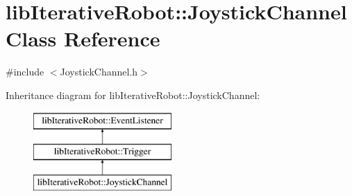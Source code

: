 \hypertarget{classlib_iterative_robot_1_1_joystick_channel}{}\section{lib\+Iterative\+Robot\+::Joystick\+Channel Class Reference}
\label{classlib_iterative_robot_1_1_joystick_channel}


{\ttfamily \#include $<$Joystick\+Channel.\+h$>$}

Inheritance diagram for lib\+Iterative\+Robot\+::Joystick\+Channel\+:\begin{figure}[H]
\begin{center}
\leavevmode
\includegraphics[height=3.000000cm]{classlib_iterative_robot_1_1_joystick_channel}
\end{center}
\end{figure}

